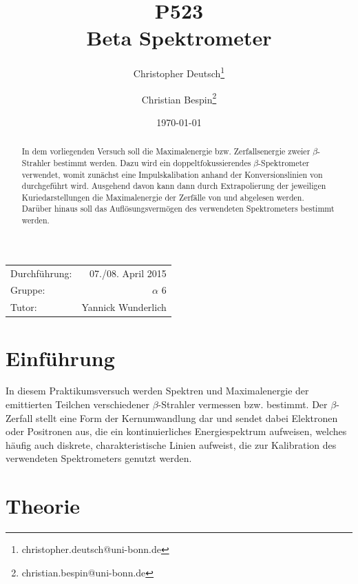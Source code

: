 \documentclass[11pt, a4paper]{article}
\title{P523 \\ Beta Spektrometer}
\author{Christopher Deutsch\footnote{christopher.deutsch@uni-bonn.de} \and Christian Bespin\footnote{christian.bespin@uni-bonn.de}}
\date{\today}
\numberwithin{equation}{section}
\begin{document}
\begin{titlepage}

\maketitle

\begin{center}
\begin{tabular}{l r}
Durchführung: & 07./08. April 2015 \\
Gruppe: & $\alpha$ 6 \\
Tutor: & Yannick Wunderlich
\end{tabular}
\end{center}

\begin{abstract}
\noindent In dem vorliegenden Versuch soll die Maximalenergie bzw. Zerfallsenergie zweier $\beta$-Strahler bestimmt werden.
Dazu wird ein doppeltfokussierendes $\beta$-Spektrometer verwendet, womit zunächst eine Impulskalibation anhand der Konversionslinien von  durchgeführt wird.
Ausgehend davon kann dann durch Extrapolierung der jeweiligen Kuriedarstellungen die Maximalenergie der Zerfälle von  und  abgelesen werden.
Darüber hinaus soll das Auflösungsvermögen des verwendeten Spektrometers bestimmt werden.
\end{abstract}

\end{titlepage}

\tableofcontents
\newpage


\section{Einführung}

In diesem Praktikumsversuch werden Spektren und Maximalenergie der emittierten Teilchen verschiedener $\beta$-Strahler vermessen bzw. bestimmt.
Der $\beta$-Zerfall stellt eine Form der Kernumwandlung dar und sendet dabei Elektronen oder Positronen aus, die ein kontinuierliches Energiespektrum aufweisen, welches häufig auch diskrete, charakteristische Linien aufweist, die zur Kalibration des verwendeten Spektrometers genutzt werden.

\section{Theorie}
\end{document}
